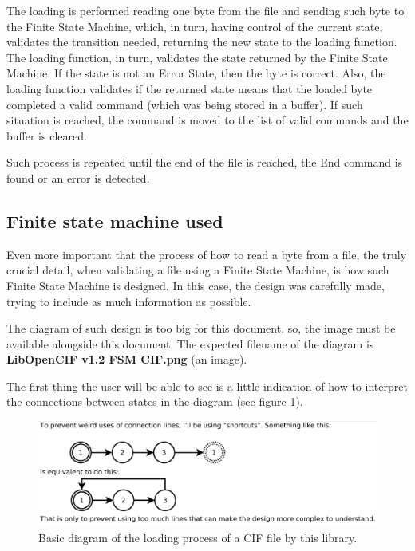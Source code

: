 \documentclass[11pt,twoside,openany,x11names,svgnames]{memoir}
\begin{document}
The loading is performed reading one byte from the file and sending such byte to the Finite State Machine, which, in turn, having control of the current state, validates the transition needed, returning the new state to the loading function. The loading function, in turn, validates the state returned by the Finite State Machine. If the state is not an Error State, then the byte is correct. Also, the loading function validates if the returned state means that the loaded byte completed a valid command (which was being stored in a buffer). If such situation is reached, the command is moved to the list of valid commands and the buffer is cleared.

Such process is repeated until the end of the file is reached, the End command is found or an error is detected.

\subsection{Finite state machine used}\label{Finite-state-machine-used}

Even more important that the process of how to read a byte from a file, the truly crucial detail, when validating a file using a Finite State Machine, is how such Finite State Machine is designed. In this case, the design was carefully made, trying to include as much information as possible.

The diagram of such design is too big for this document, so, the image must be available alongside this document. The expected filename of the diagram is \textbf{LibOpenCIF v1.2 FSM CIF.png} (an image).

The first thing the user will be able to see is a little indication of how to interpret the connections between states in the diagram (see figure \ref{fig:fsmconnections}).

\begin{figure}
	\centering
	\includegraphics[scale=0.5, clip=true, trim= 0pt 0pt 0pt 0pt]{images/chapter03-image08}
	\caption{Basic diagram of the loading process of a CIF file by this library.}
	\label{fig:fsmconnections}
\end{figure}
\end{document}

